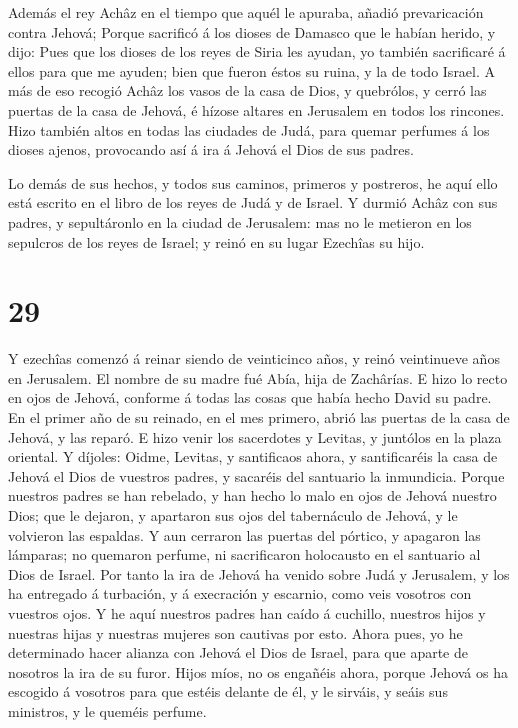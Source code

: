  Además el rey Achâz en el tiempo que aquél le apuraba,
añadió prevaricación contra Jehová;  Porque sacrificó á los
dioses de Damasco que le habían herido, y dijo: Pues que los dioses de
los reyes de Siria les ayudan, yo también sacrificaré á ellos para que
me ayuden; bien que fueron éstos su ruina, y la de todo Israel.
 A más de eso recogió Achâz los vasos de la casa de Dios, y
quebrólos, y cerró las puertas de la casa de Jehová, é hízose altares en
Jerusalem en todos los rincones.  Hizo también altos en
todas las ciudades de Judá, para quemar perfumes á los dioses ajenos,
provocando así á ira á Jehová el Dios de sus padres.

 Lo demás de sus hechos, y todos sus caminos, primeros y
postreros, he aquí ello está escrito en el libro de los reyes de Judá y
de Israel.  Y durmió Achâz con sus padres, y sepultáronlo
en la ciudad de Jerusalem: mas no le metieron en los sepulcros de los
reyes de Israel; y reinó en su lugar Ezechîas su hijo.

\hypertarget{section-28}{%
\section{29}\label{section-28}}

 Y ezechîas comenzó á reinar siendo de veinticinco años, y
reinó veintinueve años en Jerusalem. El nombre de su madre fué Abía,
hija de Zachârías.  E hizo lo recto en ojos de Jehová,
conforme á todas las cosas que había hecho David su padre. 
En el primer año de su reinado, en el mes primero, abrió las puertas de
la casa de Jehová, y las reparó.  E hizo venir los
sacerdotes y Levitas, y juntólos en la plaza oriental.  Y
díjoles: Oidme, Levitas, y santificaos ahora, y santificaréis la casa de
Jehová el Dios de vuestros padres, y sacaréis del santuario la
inmundicia.  Porque nuestros padres se han rebelado, y han
hecho lo malo en ojos de Jehová nuestro Dios; que le dejaron, y
apartaron sus ojos del tabernáculo de Jehová, y le volvieron las
espaldas.  Y aun cerraron las puertas del pórtico, y
apagaron las lámparas; no quemaron perfume, ni sacrificaron holocausto
en el santuario al Dios de Israel.  Por tanto la ira de
Jehová ha venido sobre Judá y Jerusalem, y los ha entregado á turbación,
y á execración y escarnio, como veis vosotros con vuestros ojos.
 Y he aquí nuestros padres han caído á cuchillo, nuestros
hijos y nuestras hijas y nuestras mujeres son cautivas por esto.
 Ahora pues, yo he determinado hacer alianza con Jehová el
Dios de Israel, para que aparte de nosotros la ira de su furor.
 Hijos míos, no os engañéis ahora, porque Jehová os ha
escogido á vosotros para que estéis delante de él, y le sirváis, y seáis
sus ministros, y le queméis perfume.

